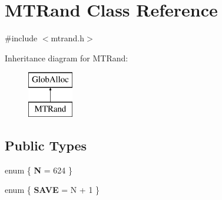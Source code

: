 \hypertarget{classMTRand}{\section{M\-T\-Rand Class Reference}
\label{classMTRand}
}


{\ttfamily \#include $<$mtrand.\-h$>$}

Inheritance diagram for M\-T\-Rand\-:\begin{figure}[H]
\begin{center}
\leavevmode
\includegraphics[height=2.000000cm]{classMTRand}
\end{center}
\end{figure}
\subsection*{Public Types}
\begin{DoxyCompactItemize}
\item 
enum \{ {\bfseries N} = 624
 \}
\item 
enum \{ {\bfseries S\-A\-V\-E} = N + 1
 \}
\end{DoxyCompactItemize}
